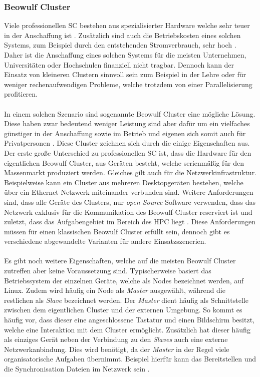 \subsubsection{Beowulf Cluster}
Viele professionellen \ac{SC} bestehen aus spezialisierter Hardware welche sehr teuer in der Anschaffung ist \cite{brown2004engineering}. Zusätzlich sind auch die Betriebskosten eines solchen Systems, zum Beispiel durch den entstehenden Stromverbrauch, sehr hoch \cite{nielsen2016introduction}. Daher ist die Anschaffung eines solchen Systems für die meisten Unternehmen, Universitäten oder Hochschulen finanziell nicht tragbar. Dennoch kann der Einsatz von kleineren Clustern sinnvoll sein zum Beispiel in der Lehre oder für weniger rechenaufwendigen Probleme, welche trotzdem von einer Parallelisierung profitieren. 
\\\\
In einem solchen Szenario sind sogenannte Beowulf Cluster eine mögliche Lösung. Diese haben zwar bedeutend weniger Leistung sind aber dafür um ein vielfaches günstiger in der Anschaffung sowie im Betrieb und eigenen sich somit auch für Privatpersonen \cite{adams2008microwulf}. Diese Cluster zeichnen sich durch die einige Eigenschaften aus. Der erste große Unterschied zu professionellen \ac{SC} ist, dass die Hardware für den eigentlichen Beowulf Cluster, aus Geräten besteht, welche serienmäßig für den Massenmarkt produziert werden. Gleiches gilt auch für die Netzwerkinfrastruktur. Beispielweise kann ein Cluster aus mehreren Desktopgeräten bestehen, welche über ein Ethernet-Netzwerk miteinander verbunden sind. Weitere Anforderungen sind, dass alle Geräte des Clusters, nur \emph{open Source} Software verwenden, dass das Netzwerk exklusiv für die Kommunikation des Beowulf-Cluster reserviert ist und zuletzt, dass das Aufgabengebiet im Bereich des \ac{HPC} liegt \cite{brown2004engineering}. Diese Anforderungen müssen für einen klassischen Beowulf Cluster erfüllt sein, dennoch gibt es verschiedene abgewandelte Varianten für andere Einsatzszenerien.
\\\\
Es gibt noch weitere Eigenschaften, welche auf die meisten Beowulf Cluster zutreffen aber keine Voraussetzung sind. Typischerweise basiert das Betriebssystem der einzelnen Geräte, welche als Nodes bezeichnet werden, auf Linux. Zudem wird häufig ein Node als \emph{Master} ausgewählt, während die restlichen als \emph{Slave} bezeichnet werden. Der \emph{Master} dient häufig als Schnittstelle zwischen dem eigentlichen Cluster und der externen Umgebung. So kommt es häufig vor, dass dieser eine angeschlossene Tastatur und einen Bildschirm besitzt, welche eine Interaktion mit dem Cluster ermöglicht. Zusätzlich hat dieser häufig als einziges Gerät neben der Verbindung zu den \emph{Slaves} auch eine externe Netzwerkanbindung. Dies wird benötigt, da der \emph{Master} in der Regel viele organisatorische Aufgaben übernimmt. Beispiel hierfür kann das Bereitstellen und die Synchronisation Dateien im Netzwerk sein \cite{brown2004engineering}.
